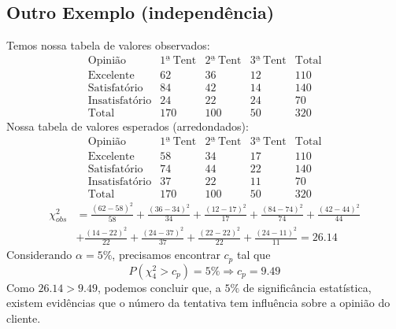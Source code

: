 \documentclass[
  letterpaper,
  DIV=11,
  numbers=noendperiod]{scrreprt}
\begin{document}
\subsection{Outro Exemplo
(independência)}\label{outro-exemplo-independuxeancia}

Temos nossa tabela de valores observados: \[
\begin{array}{c|ccc|c}
\mathrm{Opinião}  & \mathrm{1ª~Tent}  & \mathrm{2ª~Tent}  & \mathrm{3ª~Tent}  & \mathrm{Total} \\
\hline
\mathrm{Excelente}  &  62  & 36 & 12 & 110\\
\mathrm{Satisfatório}  & 84 & 42 & 14 & 140\\
\mathrm{Insatisfatório}  & 24 & 22 & 24 & 70 \\
\hline
\mathrm{Total}  & 170 & 100 & 50 & 320 
\end{array}
\] Nossa tabela de valores esperados (arredondados): \[
\begin{array}{c|ccc|c}
\mathrm{Opinião}  & \mathrm{1ª~Tent}  & \mathrm{2ª~Tent}  & \mathrm{3ª~Tent}  & \mathrm{Total} \\
\hline
\mathrm{Excelente}  &  58 & 34 & 17 & 110 \\
\mathrm{Satisfatório}  & 74 & 44 & 22 & 140\\
\mathrm{Insatisfatório}  & 37 & 22 & 11 & 70 \\
\hline
\mathrm{Total}  & 170 & 100 & 50 & 320 
\end{array}
\] \[
\begin{aligned}
\chi^2_{obs} &= \frac{(62-58)^2}{58} + \frac{(36-34)^2}{34} + \frac{(12-17)^2}{17} + \frac{(84-74)^2}{74} +
\frac{(42-44)^2}{44} \\
&+ \frac{(14-22)^2}{22} + \frac{(24-37)^2}{37} + \frac{(22-22)^2}{22} + \frac{(24-11)^2}{11} = 26.14
\end{aligned}
\] Considerando \(\alpha= 5\%\), precisamos encontrar \(c_{p}\) tal que
\[
P(\chi^2_{4}>c_{p})=5\% \Rightarrow c_{p} = 9.49
\] Como \(26.14 > 9.49\), podemos concluir que, a \(5\%\) de
significância estatística, existem evidências que o número da tentativa
tem influência sobre a opinião do cliente.


\printbibliography
\end{document}
